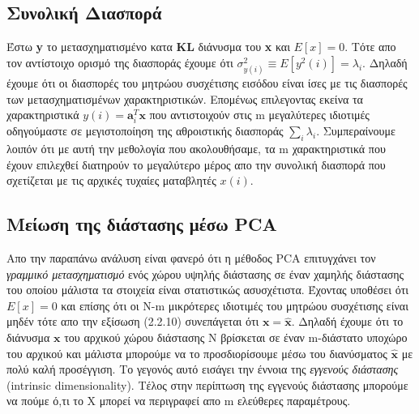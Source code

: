 \subsection{Συνολική Διασπορά}
\par
Έστω \textlatin{\textbf{y}} το μετασχηματισμένο κατα \textlatin{\textbf{KL}} διάνυσμα του \textlatin{\textbf{x}} και $E[x]=0$. Τότε απο τον αντίστοιχο ορισμό της διασποράς έχουμε ότι $\sigma^{2}_{y(i)} \equiv E[y^{2}(i)]=\lambda_{i}$. Δηλαδή έχουμε ότι οι διασπορές του μητρώου συσχέτισης εισόδου είναι ίσες με τις διασπορές των μετασχηματισμένων χαρακτηριστικών. Επομένως επιλεγοντας εκείνα τα χαρακτηριστικά $ y(i)=\mathbf{a}_{i}^{T}\mathbf{x} $ που αντιστοιχούν στις \textlatin{m} μεγαλύτερες ιδιοτιμές οδηγούμαστε σε μεγιστοποίηση της αθροιστικής διασποράς $ \sum_{i} \lambda_{i} $. Συμπεραίνουμε λοιπόν ότι με αυτή την μεθολογία που ακολουθήσαμε, τα \textlatin{m} χαρακτηριστικά που έχουν επιλεχθεί διατηρούν το μεγαλύτερο μέρος απο την συνολική διασπορά που σχετίζεται με τις αρχικές τυχαίες ματαβλητές $x(i)$.

\subsection{Μείωση της διάστασης μέσω \textlatin{PCA}}
\par
Απο την παραπάνω ανάλυση είναι φανερό ότι η μέθοδος \textlatin{PCA} επιτυγχάνει τον \textit{γραμμικό μετασχηματισμό} ενός χώρου υψηλής διάστασης σε έναν χαμηλής διάστασης του οποίου μάλιστα τα στοιχεία είναι στατιστικώς ασυσχέτιστα. Έχοντας υποθέσει ότι $E[x]=0$ και επίσης ότι οι \textlatin{N-m} μικρότερες ιδιοτιμές του μητρώου συσχέτισης είναι μηδέν τότε απο την εξίσωση (2.2.10) συνεπάγεται ότι $\mathbf{x} = \mathbf{\widehat{x}}$. Δηλαδή έχουμε ότι το διάνυσμα $\mathbf{x}$ του αρχικού χώρου διάστασης \textlatin{N} βρίσκεται σε έναν \textlatin{m}-διάστατο υποχώρο του αρχικού και μάλιστα μπορούμε να το προσδιορίσουμε μέσω του διανύσματος $\mathbf{\widehat{x}}$ με πολύ καλή προσέγγιση. Το γεγονός αυτό εισάγει την έννοια της \textit{εγγενούς διάστασης} (\textlatin{intrinsic dimensionality}). Τέλος στην περίπτωση της εγγενούς διάστασης μπορούμε να πούμε ό,τι το \textlatin{X} μπορεί να περιγραφεί απο \textlatin{m} ελεύθερες παραμέτρους.

